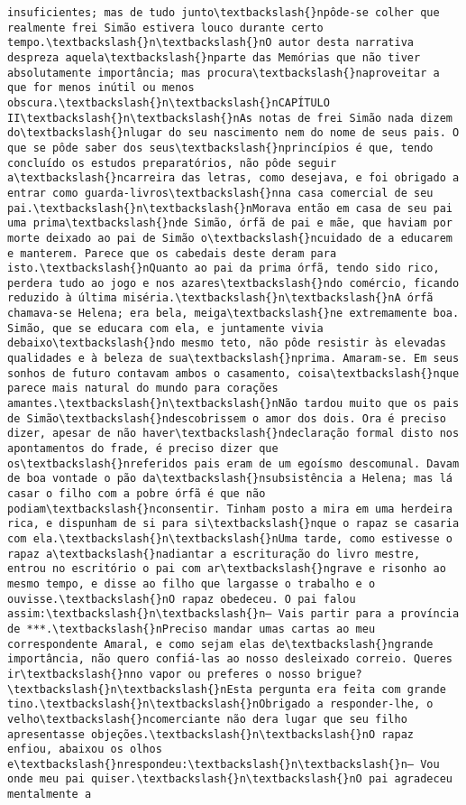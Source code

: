\documentclass[11pt]{article}
\begin{document}
\begin{Verbatim}[commandchars=\\\{\}]
insuficientes; mas de tudo junto\textbackslash{}npôde-se colher que realmente frei Simão estivera louco durante certo tempo.\textbackslash{}n\textbackslash{}nO autor desta narrativa despreza aquela\textbackslash{}nparte das Memórias que não tiver absolutamente importância; mas procura\textbackslash{}naproveitar a que for menos inútil ou menos obscura.\textbackslash{}n\textbackslash{}nCAPÍTULO II\textbackslash{}n\textbackslash{}nAs notas de frei Simão nada dizem do\textbackslash{}nlugar do seu nascimento nem do nome de seus pais. O que se pôde saber dos seus\textbackslash{}nprincípios é que, tendo concluído os estudos preparatórios, não pôde seguir a\textbackslash{}ncarreira das letras, como desejava, e foi obrigado a entrar como guarda-livros\textbackslash{}nna casa comercial de seu pai.\textbackslash{}n\textbackslash{}nMorava então em casa de seu pai uma prima\textbackslash{}nde Simão, órfã de pai e mãe, que haviam por morte deixado ao pai de Simão o\textbackslash{}ncuidado de a educarem e manterem. Parece que os cabedais deste deram para isto.\textbackslash{}nQuanto ao pai da prima órfã, tendo sido rico, perdera tudo ao jogo e nos azares\textbackslash{}ndo comércio, ficando reduzido à última miséria.\textbackslash{}n\textbackslash{}nA órfã chamava-se Helena; era bela, meiga\textbackslash{}ne extremamente boa. Simão, que se educara com ela, e juntamente vivia debaixo\textbackslash{}ndo mesmo teto, não pôde resistir às elevadas qualidades e à beleza de sua\textbackslash{}nprima. Amaram-se. Em seus sonhos de futuro contavam ambos o casamento, coisa\textbackslash{}nque parece mais natural do mundo para corações amantes.\textbackslash{}n\textbackslash{}nNão tardou muito que os pais de Simão\textbackslash{}ndescobrissem o amor dos dois. Ora é preciso dizer, apesar de não haver\textbackslash{}ndeclaração formal disto nos apontamentos do frade, é preciso dizer que os\textbackslash{}nreferidos pais eram de um egoísmo descomunal. Davam de boa vontade o pão da\textbackslash{}nsubsistência a Helena; mas lá casar o filho com a pobre órfã é que não podiam\textbackslash{}nconsentir. Tinham posto a mira em uma herdeira rica, e dispunham de si para si\textbackslash{}nque o rapaz se casaria com ela.\textbackslash{}n\textbackslash{}nUma tarde, como estivesse o rapaz a\textbackslash{}nadiantar a escrituração do livro mestre, entrou no escritório o pai com ar\textbackslash{}ngrave e risonho ao mesmo tempo, e disse ao filho que largasse o trabalho e o ouvisse.\textbackslash{}nO rapaz obedeceu. O pai falou assim:\textbackslash{}n\textbackslash{}n— Vais partir para a província de ***.\textbackslash{}nPreciso mandar umas cartas ao meu correspondente Amaral, e como sejam elas de\textbackslash{}ngrande importância, não quero confiá-las ao nosso desleixado correio. Queres ir\textbackslash{}nno vapor ou preferes o nosso brigue?\textbackslash{}n\textbackslash{}nEsta pergunta era feita com grande tino.\textbackslash{}n\textbackslash{}nObrigado a responder-lhe, o velho\textbackslash{}ncomerciante não dera lugar que seu filho apresentasse objeções.\textbackslash{}n\textbackslash{}nO rapaz enfiou, abaixou os olhos e\textbackslash{}nrespondeu:\textbackslash{}n\textbackslash{}n— Vou onde meu pai quiser.\textbackslash{}n\textbackslash{}nO pai agradeceu mentalmente a 
\end{Verbatim}
\end{document}
